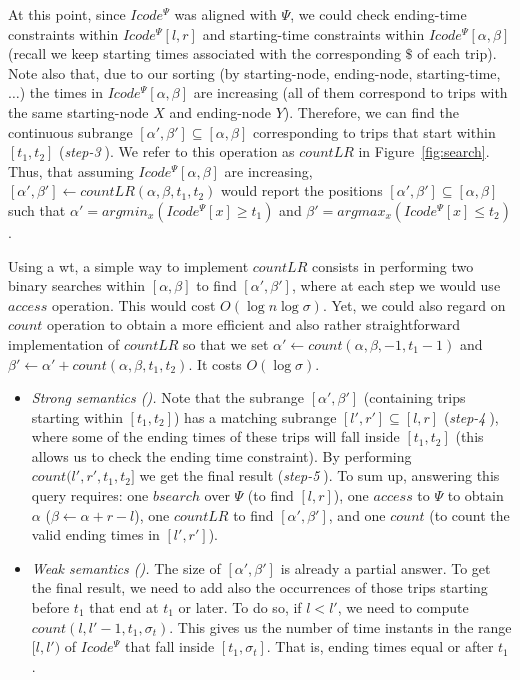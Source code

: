 \begin{itemize}[leftmargin=3mm]
		At this point, since $Icode^{\Psi}$  was aligned with $\Psi$, 
		we could check ending-time constraints within $Icode^{\Psi}[l,r]$  and starting-time constraints 
		within $Icode^{\Psi}[\alpha,\beta]$ (recall we keep starting times associated with the corresponding $\$$ of each trip).
		Note also that, due to our sorting (by starting-node, ending-node, starting-time,$\dots$) the times in $Icode^{\Psi}[\alpha,\beta]$ are 
		increasing (all of them correspond to trips with the same starting-node $X$ and ending-node $Y$). Therefore,
		we can find the continuous subrange $[\alpha',\beta'] \subseteq [\alpha,\beta] $ corresponding to trips
		that start within $[t_1, t_2]$ ({\em step-\textcircled{3}}). We refer to this operation as $countLR$ in Figure~\ref{fig:search}.
		Thus, that assuming $Icode^{\Psi}[\alpha,\beta]$ are increasing,  
		$[\alpha',\beta'] \leftarrow countLR(\alpha,\beta,t_1,t_2)$ would report the 
		positions $[\alpha',\beta'] \subseteq [\alpha,\beta]$ such that $\alpha' = argmin_{x} (Icode^{\Psi}[x] \geq t_1)$ and
		$\beta' = argmax_{x} (Icode^{\Psi}[x] \leq t_2)$.
		
		Using a \gls{wt}, a simple way to implement $countLR$  consists in performing  two binary searches within 
		$[\alpha,\beta]$ to find $[\alpha',\beta']$, where at each step we would use $access$ operation. This would cost $O(\log n \log \sigma)$. 
		Yet, we could also regard on $count$ operation to obtain a more efficient and also rather straightforward 
		implementation of $countLR$ so that we set $\alpha' \leftarrow count(\alpha,\beta,-1,t_1-1)$ and
		$\beta' \leftarrow \alpha'+ count(\alpha,\beta,t_1,t_2)$. It costs $O(\log\sigma)$.
		
		
		\begin{itemize}
			\item {\em Strong semantics (\Tfxtys).} Note that the subrange $[\alpha',\beta']$ (containing trips starting within $[t_1,t_2]$) 
			has a matching subrange $[l',r'] \subseteq [l,r]$ ({\em step-\textcircled{4}}), where some of the ending times of these trips will fall inside 
			$[t_1, t_2]$ (this allows us to check the ending time constraint). By performing  $count(l',r',t_1,t_2]$  we get the final result 
			({\em step-\textcircled{5}}). 
			To sum up, answering this query  requires: one $bsearch$ over $\Psi$ (to find $[l,r]$), one $access$ to $\Psi$ to obtain
			 $\alpha$ ($\beta\leftarrow \alpha+r-l$), one $countLR$ to find $[\alpha',\beta']$, and one $count$ 
			 (to count the valid ending times in $[l',r']$).
			
			
			\item {\em Weak semantics (\Tfxtyw).}
			The size of $[\alpha',\beta']$ is already a partial answer. To get the final result, we need to add 
			also the occurrences of those trips starting before $t_1$ that end at $t_1$ or later. 
			To do so, if $l<l'$, we need to compute $count(l,l'-1, t_1, {\sigma_t})$. This gives us the number of time 
			instants in the range $[l,l')$ of  $Icode^{\Psi}$ that fall inside $[t_1, {\sigma_t}]$. 
			That is, ending times equal or after $t_1$.
		\end{itemize}
		

\end{itemize}
